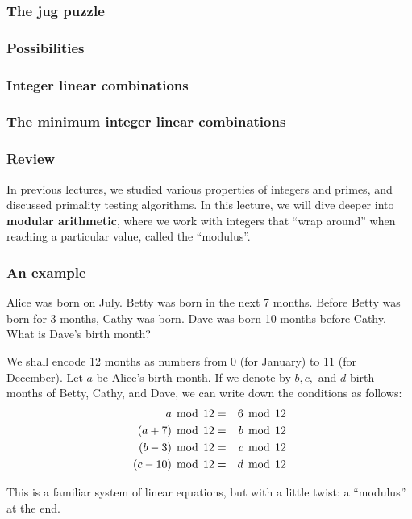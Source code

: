 

\begin{frame}\frametitle{The jug puzzle}
\end{frame}

\begin{frame}\frametitle{Possibilities}
\end{frame}

\begin{frame}\frametitle{Integer linear combinations}
\end{frame}

\begin{frame}\frametitle{The minimum integer linear combinations}
\end{frame}

\begin{frame}\frametitle{Review}
  In previous lectures, we studied various properties of integers and
  primes, and discussed primality testing algorithms.  In this
  lecture, we will dive deeper into {\bf modular arithmetic}, where we
  work with integers that ``wrap around'' when reaching a particular
  value, called the ``modulus''.
\end{frame}

\begin{frame}\frametitle{An example}
  \begin{tcolorbox}
    Alice was born on July.  Betty was born in the next 7 months.
    Before Betty was born for 3 months, Cathy was born.  Dave was born
    10 months before Cathy.  What is Dave's birth month?
  \end{tcolorbox}

  \pause We shall encode 12 months as numbers from 0 (for January) to
  11 (for December).  Let $a$ be Alice's birth month.  If we denote by
  $b,c,$ and $d$ birth months of Betty, Cathy, and Dave, we can write
  down the conditions as follows:
  \pause
  \begin{eqnarray*}
    a \,\bmod\, 12 &=& 6\,\bmod\, 12\\
    (a + 7) \,\bmod\, 12 &=& b \,\bmod\, 12 \\
    (b - 3) \,\bmod\, 12 &=& c \,\bmod\, 12 \\
    (c - 10) \,\bmod\, 12 &=& d \,\bmod\, 12
  \end{eqnarray*}
  
  \pause This is a familiar system of linear equations, but with a
  little twist: a ``modulus'' at the end.
\end{frame}

